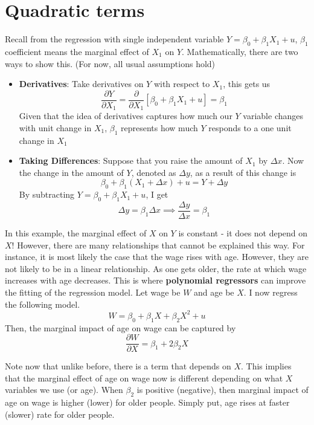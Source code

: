 \section{Quadratic terms}
Recall from the regression with single independent variable $Y= \beta_0 + \beta_1X_1+u$, $\beta_1$ coefficient means the marginal effect of $X_1$ on $Y$. Mathematically, there are two ways to show this. (For now, all usual assumptions hold)
\begin{itemize}
\item \textbf{Derivatives}: Take derivatives on $Y$ with respect to $X_1$, this gets us
\[
\frac{\partial Y}{\partial X_1} = \frac{\partial}{\partial X_1}[ \beta_0 + \beta_1X_1+u ] = \beta_1
\]
Given that the idea of derivatives captures how much our $Y$ variable changes with unit change in $X_1$, $\beta_1$ represents how much $Y$ responds to a one unit change in $X_1$
\item\textbf{Taking Differences}: Suppose that you raise the amount of $X_1$ by $\Delta x$. Now the change in the  amount of $Y$, denoted as $\Delta y$, as a result of this change is
\[
\beta_0 + \beta_1(X_1+\Delta x)+u = Y+\Delta y
\] 
By subtracting $Y= \beta_0 + \beta_1X_1+u$, I get
\[
\Delta y = \beta_1 \Delta x \implies \frac{\Delta y}{\Delta x} = \beta_1
\]
\end{itemize} \par\medskip
In this example, the marginal effect of $X$ on $Y$ is constant - it does not depend on $X$! However, there are many relationships that cannot be explained this way. For instance, it is most likely the case that the wage rises with age. However, they are not likely to be in a linear relationship. As one gets older, the rate at which wage increases with age decreases. This is where \textbf{polynomial regressors} can improve the fitting of the regression model. Let wage be $W$ and age be $X$. I now regress the following model.
\[
W = \beta_0 + \beta_1 X+ \beta_2 X^2+u
\]
Then, the marginal impact of age on wage can be captured by
\[
\frac{\partial W}{\partial X} = \beta_1 + 2\beta_2 X
\]\par\medskip
Note now that unlike before, there is a term that depends on $X$. This implies that the marginal effect of age on wage now is different depending on what $X$ variables we use (or age). When $\beta_2$ is positive (negative), then marginal impact of age on wage is higher (lower) for older people. Simply put, age rises at faster (slower) rate for older people. \par\medskip


